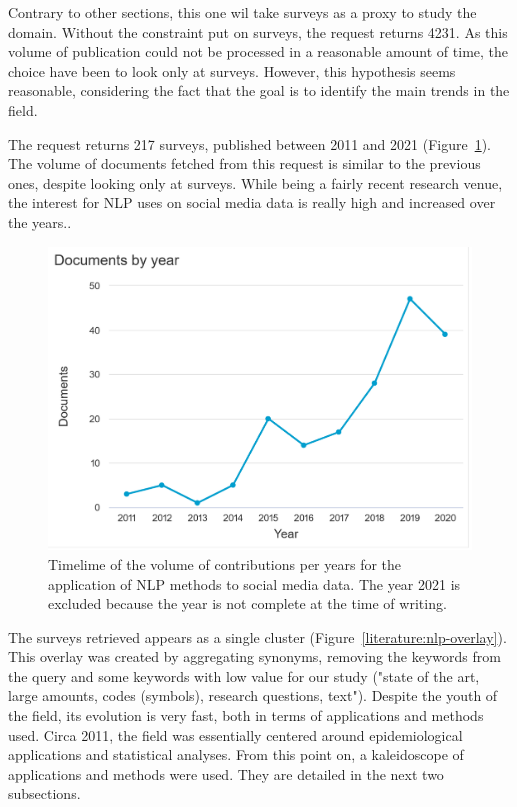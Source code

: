 Contrary to other sections, this one wil take surveys as a proxy to study the domain.
Without the constraint put on surveys, the request returns 4231.
As this volume of publication could not be processed in a reasonable amount of time, the choice have been to look only at surveys.
However, this hypothesis seems reasonable, considering the fact that the goal is to identify the main trends in the field.

The request returns 217 surveys, published between 2011 and 2021 (Figure~\ref{literature:nlp-hist}).
The volume of documents fetched from this request is similar to the previous ones, despite looking only at surveys.
While being a fairly recent research venue, the interest for NLP uses on social media data is really high and increased over the years..

\begin{figure}[htb]
    \centering
    \includegraphics[width=\textwidth]{figures/chap-2/nlp-hist.pdf}
    \caption{Timelime of the volume of contributions per years for the application of NLP methods to social media data. The year 2021 is excluded because the year is not complete at the time of writing.}
    \label{literature:nlp-hist}
\end{figure}

The surveys retrieved appears as a single cluster (Figure~\ref{literature:nlp-overlay}).
This overlay was created by aggregating synonyms, removing the keywords from the query and some keywords with low value for our study ("state of the art, large amounts, codes (symbols), research questions, text").
Despite the youth of the field, its evolution is very fast, both in terms of applications and methods used.
Circa 2011, the field was essentially centered around epidemiological applications and statistical analyses.
From this point on, a kaleidoscope of applications and methods were used.
They are detailed in the next two subsections.

